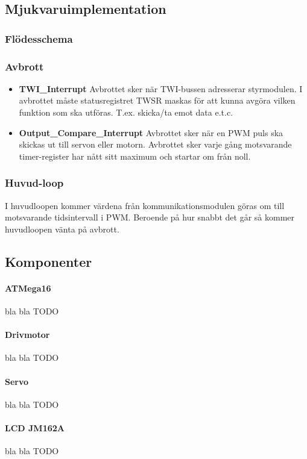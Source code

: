 \documentclass[designspec/spec.tex]{subfiles}
\begin{document}
\subsection{Mjukvaruimplementation}

\subsubsection{Flödesschema}

\subsubsection{Avbrott}

\begin{itemize}
	\item \textbf{TWI\_Interrupt} Avbrottet sker när TWI-bussen adresserar
	styrmodulen. I avbrottet måste statusregistret TWSR maskas för att kunna
	avgöra vilken funktion som ska utföras. T.ex. skicka/ta emot data e.t.c. 

	\item \textbf{Output\_Compare\_Interrupt} Avbrottet sker när en PWM puls
	ska skickas ut till servon eller motorn. Avbrottet sker varje gång
	motsvarande timer-register har nått sitt maximum och startar om från noll.
\end{itemize}

\subsubsection{Huvud-loop}
I huvudloopen kommer värdena från kommunikationsmodulen göras om till
motsvarande tidsintervall i PWM. Beroende på hur snabbt det går så kommer
huvudloopen vänta på avbrott.


\subsection{Komponenter}
\paragraph{ATMega16} bla bla TODO
\paragraph{Drivmotor} bla bla TODO
\paragraph{Servo} bla bla TODO
\paragraph{LCD JM162A} bla bla TODO
\end{document}
